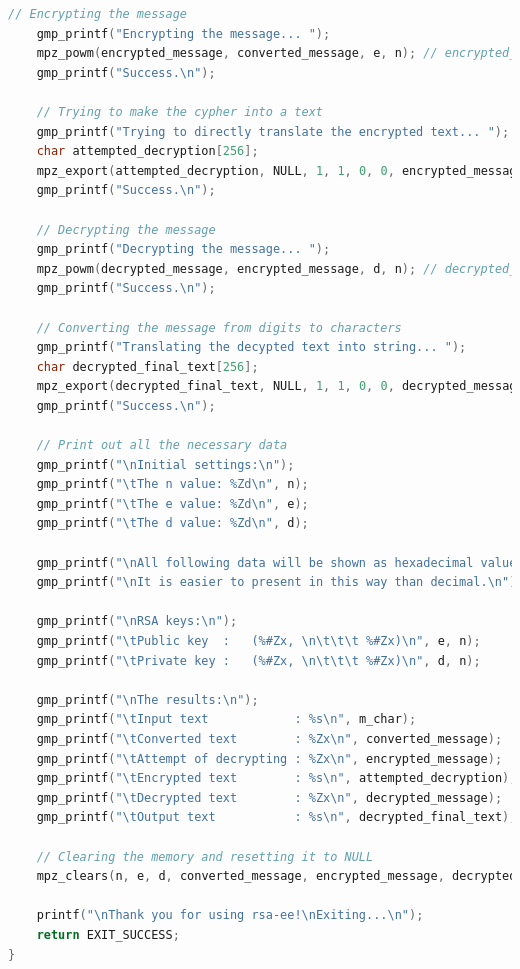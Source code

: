 \documentclass[a4paper, 12pt]{article}
\begin{document}
\begin{lstlisting}[language=C, caption=Source Code of rsa.c]
    // Encrypting the message
    gmp_printf("Encrypting the message... ");
    mpz_powm(encrypted_message, converted_message, e, n); // encrypted_message = pow(m, e) % n
    gmp_printf("Success.\n");
    
    // Trying to make the cypher into a text
    gmp_printf("Trying to directly translate the encrypted text... ");
    char attempted_decryption[256];
    mpz_export(attempted_decryption, NULL, 1, 1, 0, 0, encrypted_message);
    gmp_printf("Success.\n");
    
    // Decrypting the message
    gmp_printf("Decrypting the message... ");
    mpz_powm(decrypted_message, encrypted_message, d, n); // decrypted_message = pow(encrypted_message, d) % n
    gmp_printf("Success.\n");
    
    // Converting the message from digits to characters
    gmp_printf("Translating the decypted text into string... ");
    char decrypted_final_text[256];
    mpz_export(decrypted_final_text, NULL, 1, 1, 0, 0, decrypted_message);
    gmp_printf("Success.\n");
    
    // Print out all the necessary data 
    gmp_printf("\nInitial settings:\n");
    gmp_printf("\tThe n value: %Zd\n", n);
    gmp_printf("\tThe e value: %Zd\n", e);
    gmp_printf("\tThe d value: %Zd\n", d);
    
    gmp_printf("\nAll following data will be shown as hexadecimal values.");
    gmp_printf("\nIt is easier to present in this way than decimal.\n");
    
    gmp_printf("\nRSA keys:\n");
    gmp_printf("\tPublic key  :   (%#Zx, \n\t\t\t %#Zx)\n", e, n);
    gmp_printf("\tPrivate key :   (%#Zx, \n\t\t\t %#Zx)\n", d, n);
    
    gmp_printf("\nThe results:\n");
    gmp_printf("\tInput text            : %s\n", m_char);
    gmp_printf("\tConverted text        : %Zx\n", converted_message);
    gmp_printf("\tAttempt of decrypting : %Zx\n", encrypted_message);
    gmp_printf("\tEncrypted text        : %s\n", attempted_decryption);
    gmp_printf("\tDecrypted text        : %Zx\n", decrypted_message);
    gmp_printf("\tOutput text           : %s\n", decrypted_final_text);
    
    // Clearing the memory and resetting it to NULL
    mpz_clears(n, e, d, converted_message, encrypted_message, decrypted_message, NULL);
    
    printf("\nThank you for using rsa-ee!\nExiting...\n");
    return EXIT_SUCCESS;
}
\end{lstlisting}
\end{document}
